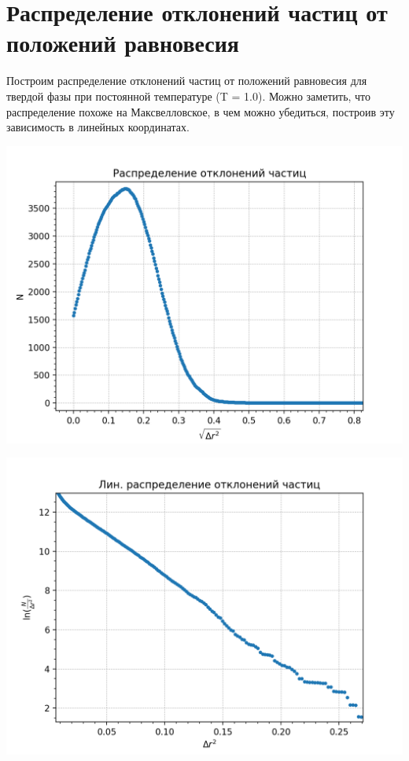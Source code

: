 \section{Распределение отклонений частиц от положений равновесия}

Построим распределение отклонений частиц от положений равновесия для твердой фазы при постоянной температуре (T = 1.0). Можно заметить, что распределение похоже на Максвелловское, в чем можно убедиться, построив эту зависимость в линейных координатах. 

\begin{minipage}{0.47\textwidth}
    \begin{center}
        \includegraphics[width=0.9\linewidth]{name.png}\\
    \end{center}
   
\end{minipage}
\begin{minipage}{0.47\textwidth}
    \begin{center}
        \includegraphics[width=0.9\linewidth]{nam.png}\\

    \end{center}
\end{minipage}



